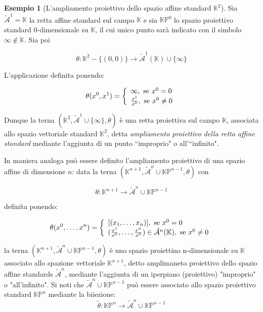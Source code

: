 \documentclass{book}
\theoremstyle{definition}
\newtheorem{esempio}{Esempio}
\newcommand{\CMP}{\mathbb{K}}
\begin{document}
\begin{esempio}[L'ampliamento proiettivo dello spazio affine standard $\mathbb{K}^2$]
Sia $\tilde{\mathcal{A}}^1 = \CMP$ la retta affine standard sul campo $\CMP$ e sia $\CMP\mathbb{P}^0$ lo spazio proiettivo standard
0-dimensionale su $\CMP$, il cui unico punto sarà indicato con il simbolo $\infty \notin \CMP$. Sia poi

\[
    \theta : \CMP^2 - \{(0, 0)\} \rightarrow \tilde{\mathcal{A}}^1(\CMP) \cup \{\infty\}
\]

L'applicazione definita ponendo:

\[
    \theta(x^0, x^1) = \left\{ 
        \begin{array}{ll}
            \infty, \ \textnormal{se} \ x^0 = 0 \\
            \frac{x^1}{x^0}, \ \textnormal{se} \ x^0 \neq 0 \\
        \end{array}
    \right.
\]

Dunque la terna $(\CMP^2, \tilde{\mathcal{A}}^1 \cup \{\infty\}, \theta)$ è una retta proiettiva sul campo $\CMP$, associata allo spazio vettoriale standard $\CMP^2$,
detta \emph{ampliamento proiettivo della retta affine standard} mediante l'aggiunta di un punto ``improprio" o all'``infinito".

In maniera analoga può essere definito l'ampliamento proiettivo di una spazio affine di dimensione $n$:
data la terna $(\CMP^{n+1}, \tilde{\mathcal{A}}^n \cup \mathbb{KP}^{n-1}, \theta)$ con

\[
    \theta : \CMP^{n+1} \rightarrow \tilde{\mathcal{A}}^n \cup \mathbb{KP}^{n-1}
\]

definita ponendo:

\[
    \theta(x^0, \dots, x^{n}) = \left\{ 
        \begin{array}{ll}
            [(x_1, \dots, x_n)], \ \textnormal{se} \ x^0 = 0 \\
            (\frac{x^1}{x^0}, \dots, \frac{x^n}{x^0}) \in \tilde{\mathcal{A}}^n(\CMP), \ \textnormal{se} \ x^0 \neq 0 \\
        \end{array}
    \right.
\]

la terna $(\CMP^{n+1}, \tilde{\mathcal{A}}^n \cup \mathbb{KP}^{n-1}, \theta)$ è uno spazio proiettino n-dimensionale su $\CMP$ associato allo spazione vettoriale $\CMP^{n+1}$, detto amplimaneto proiettivo dello spazio affine standards $\tilde{\mathcal{A}}^n$, mediante l'aggiunta di un iperpiano (proiettivo) "improprio" o "all'infinito".
Si noti che $\tilde{\mathcal{A}}^n \cup \mathbb{KP}^{n-1}$ può essere associato allo spazio proiettivo standard $\mathbb{KP}^n$ mediante la biiezione:
\[
    \tilde{\theta} : \mathbb{KP}^{n} \rightarrow \tilde{\mathcal{A}}^n \cup \mathbb{KP}^{n-1}
\]


\end{esempio}
\end{document}
